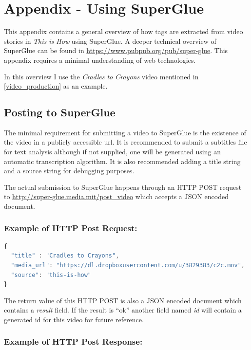 \chapter{Appendix - Using SuperGlue}
\label{appendix}

This appendix contains a general overview of how tags are extracted from video stories in \textit{This is How} using SuperGlue. A deeper technical overview of SuperGlue can be found in \url{https://www.pubpub.org/pub/super-glue}. This appendix requires a minimal understanding of web technologies. 

In this overview I use the \textit{Cradles to Crayons} video mentioned in \ref{video_production} as an example.

\section{Posting to SuperGlue}

The minimal requirement for submitting a video to SuperGlue is the existence of the video in a publicly accessible url. It is recommended to submit a subtitles file for text analysis although if not supplied, one will be generated using an automatic transcription algorithm. It is also recommended adding a title string and a source string for debugging purposes. 

The actual submission to SuperGlue happens through an HTTP POST request to \url{http://super-glue.media.mit/post_video} which accepts a JSON\cite{json} encoded document. 

\subsection*{Example of HTTP Post Request:}

\begin{lstlisting}[language=javascript]
{
  "title" : "Cradles to Crayons",
  "media_url": "https://dl.dropboxusercontent.com/u/3829383/c2c.mov",
  "source": "this-is-how"
}
\end{lstlisting}

The return value of this HTTP POST is also a JSON encoded document which contains a \textit{result} field. If the result is ``ok'' another field named \textit{id} will contain a generated id for this video for future reference. 

\vspace*{12pt}

\subsection*{Example of HTTP Post Response:}

